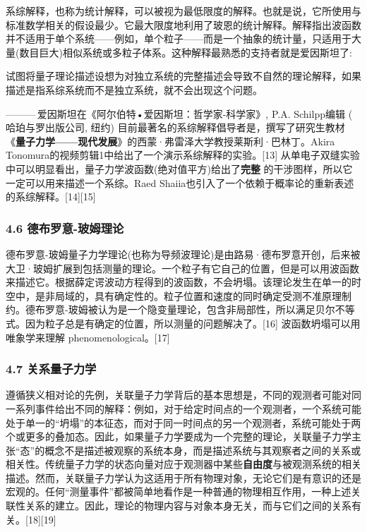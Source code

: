 系综解释，也称为统计解释，可以被视为最低限度的解释。也就是说，它所使用与标准数学相关的假设最少。它最大限度地利用了玻恩的统计解释。解释指出波函数并不适用于单个系统——例如，单个粒子——而是一个抽象的统计量，只适用于大量(数目巨大)相似系统或多粒子体系。这种解释最熟悉的支持者就是爱因斯坦了:

试图将量子理论描述设想为对独立系统的完整描述会导致不自然的理论解释，如果描述是指系综系统而不是独立系统，就不会出现这个问题。

——— 爱因斯坦在《阿尔伯特•爱因斯坦：哲学家-科学家》, P.A. Schilpp编辑 ( 哈珀与罗出版公司, 纽约)
目前最著名的系综解释倡导者是，撰写了研究生教材《\textbf{量子力学——现代发展}》的西蒙·弗雷泽大学教授莱斯利·巴林丁。Akira Tonomura的视频剪辑1中给出了一个演示系综解释的实验。[13] 从单电子双缝实验中可以明显看出，量子力学波函数(绝对值平方)给出了\textbf{完整} 的干涉图样，所以它一定可以用来描述一个系综。Raed Shaiia也引入了一个依赖于概率论的重新表述的系综解释。[14][15]

\subsubsection{4.6 德布罗意-玻姆理论}

德布罗意-玻姆量子力学理论(也称为导频波理论)是由路易·德布罗意开创，后来被大卫·玻姆扩展到包括测量的理论。一个粒子有它自己的位置，但是可以用波函数来描述它。根据薛定谔波动方程得到的波函数，不会坍塌。该理论发生在单一的时空中，是非局域的，具有确定性的。粒子位置和速度的同时确定受测不准原理制约。德布罗意-玻姆被认为是一个隐变量理论，包含非局部性，所以满足贝尔不等式。因为粒子总是有确定的位置，所以测量的问题解决了。[16] 波函数坍塌可以用唯象学来理解 phenomenological。[17]

\subsubsection{4.7 关系量子力学}

遵循狭义相对论的先例，关联量子力学背后的基本思想是，不同的观测者可能对同一系列事件给出不同的解释：例如，对于给定时间点的一个观测者，一个系统可能处于单一的“坍塌”的本征态，而对于同一时间点的另一个观测者，系统可能处于两个或更多的叠加态。因此，如果量子力学要成为一个完整的理论，关联量子力学主张“态”的概念不是描述被观察的系统本身，而是描述系统与其观察者之间的关系或相关性。传统量子力学的状态向量对应于观测器中某些\textbf{自由度}与被观测系统的相关描述。然而，关联量子力学认为这适用于所有物理对象，无论它们是有意识的还是宏观的。任何“测量事件”都被简单地看作是一种普通的物理相互作用，一种上述关联性关系的建立。因此，理论的物理内容与对象本身无关，而与它们之间的关系有关。[18][19]

